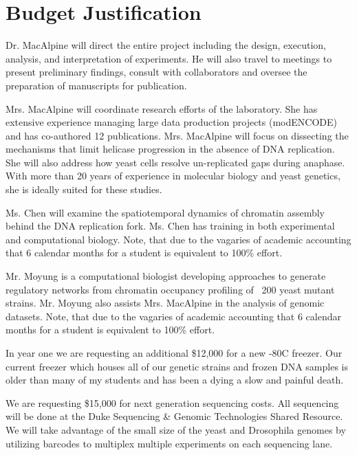 \section*{Budget Justification}
 Dr. MacAlpine will direct the entire project including the design, execution, analysis, and interpretation of experiments. He will also travel to meetings to present preliminary findings, consult with collaborators and oversee the preparation of manuscripts for publication.

 Mrs. MacAlpine will coordinate research efforts of the laboratory.  She has extensive experience managing large data production projects (modENCODE) and has co-authored 12 publications.  Mrs. MacAlpine will focus on dissecting the mechanisms that limit helicase progression in the absence of DNA replication.  She will also address how yeast cells resolve un-replicated gaps during anaphase.  With more than 20 years of experience in molecular biology and yeast genetics, she is ideally suited for these studies. 

  Ms. Chen will examine the spatiotemporal dynamics of chromatin assembly behind the DNA replication fork.  Ms. Chen has training in both experimental and computational biology. Note, that due to the vagaries of academic accounting that 6 calendar months for a student is equivalent to 100\%  effort.

  Mr. Moyung is a computational biologist developing approaches to generate regulatory networks from chromatin occupancy profiling of ~200 yeast mutant strains. Mr. Moyung also assists Mrs. MacAlpine in the analysis of genomic datasets. Note, that due to the vagaries of academic accounting that 6 calendar months for a student is equivalent to 100\% effort.

 In year one we are requesting an additional \$12,000 for a new -80C freezer.  Our current freezer which houses all of our genetic strains and frozen DNA samples is older than many of my students and has been a dying a slow and painful death.

 We are requesting \$15,000 for next generation sequencing costs.  All sequencing will be done at the Duke Sequencing \& Genomic Technologies Shared Resource.  We will take advantage of the small size of the yeast and Drosophila genomes by utilizing barcodes to multiplex multiple experiments on each sequencing lane.  

